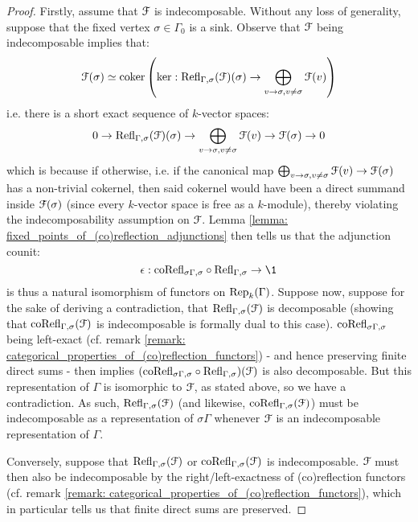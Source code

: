                 \begin{proof}
                    Firstly, assume that $\mathcal{F}$ is indecomposable. Without any loss of generality, suppose that the fixed vertex $\sigma \in \Gamma_0$ is a sink. Observe that $\mathcal{F}$ being indecomposable implies that:
                        $$\mathcal{F}(\sigma) \simeq \operatorname{coker} \left( \ker: \mathrm{Refl}_{\Gamma, \sigma}(\mathcal{F})(\sigma) \to \bigoplus_{v \to \sigma, v \not = \sigma} \mathcal{F}(v) \right)$$
                    i.e. there is a short exact sequence of $k$-vector spaces:
                        $$0 \to \mathrm{Refl}_{\Gamma, \sigma}(\mathcal{F})(\sigma) \to \bigoplus_{v \to \sigma, v \not = \sigma} \mathcal{F}(v) \to \mathcal{F}(\sigma) \to 0$$
                    which is because if otherwise, i.e. if the canonical map $\bigoplus_{v \to \sigma, v \not = \sigma} \mathcal{F}(v) \to \mathcal{F}(\sigma)$ has a non-trivial cokernel, then said cokernel would have been a direct summand inside $\mathcal{F}(\sigma)$ (since every $k$-vector space is free as a $k$-module), thereby violating the indecomposability assumption on $\mathcal{F}$. Lemma \ref{lemma: fixed_points_of_(co)reflection_adjunctions} then tells us that the adjunction counit:
                        $$\e: \co\Refl_{\sigma \Gamma, \sigma} \circ \Refl_{\Gamma, \sigma} \to \1$$
                    is thus a natural isomorphism of functors on $\mathrm{Rep}_k(\Gamma)$. Suppose now, suppose for the sake of deriving a contradiction, that $\mathrm{Refl}_{\Gamma, \sigma}(\mathcal{F})$ is decomposable (showing that $\mathrm{co}\mathrm{Refl}_{\Gamma, \sigma}(\mathcal{F})$ is indecomposable is formally dual to this case). $\mathrm{co}\mathrm{Refl}_{\sigma \Gamma, \sigma}$ being left-exact (cf. remark \ref{remark: categorical_properties_of_(co)reflection_functors}) - and hence preserving finite direct sums - then implies $(\mathrm{co}\mathrm{Refl}_{\sigma \Gamma, \sigma} \circ \mathrm{Refl}_{\Gamma, \sigma})(\mathcal{F})$ is also decomposable. But this representation of $\Gamma$ is isomorphic to $\mathcal{F}$, as stated above, so we have a contradiction. As such, $\mathrm{Refl}_{\Gamma, \sigma}(\mathcal{F})$ (and likewise, $\mathrm{co}\mathrm{Refl}_{\Gamma, \sigma}(\mathcal{F})$) must be indecomposable as a representation of $\sigma \Gamma$ whenever $\mathcal{F}$ is an indecomposable representation of $\Gamma$.
                    
                    Conversely, suppose that $\mathrm{Refl}_{\Gamma, \sigma}(\mathcal{F})$ or $\mathrm{co}\mathrm{Refl}_{\Gamma, \sigma}(\mathcal{F})$ is indecomposable. $\mathcal{F}$ must then also be indecomposable by the right/left-exactness of (co)reflection functors (cf. remark \ref{remark: categorical_properties_of_(co)reflection_functors}), which in particular tells us that finite direct sums are preserved.
                \end{proof}
